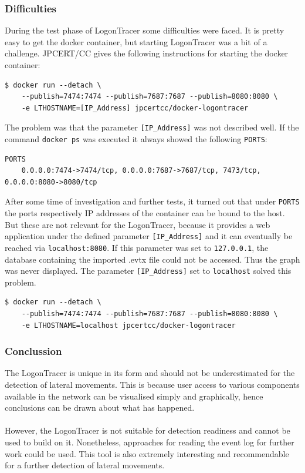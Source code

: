 \subsubsection{Difficulties}
During the test phase of LogonTracer some difficulties were faced. It is pretty easy to get the docker container, but starting LogonTracer was a bit of a challenge. JPCERT/CC gives the following instructions for starting the docker container:
\begin{lstlisting}[language=HTML,caption=LogonTracer: given docker run command]
    $ docker run --detach \
    --publish=7474:7474 --publish=7687:7687 --publish=8080:8080 \
    -e LTHOSTNAME=[IP_Address] jpcertcc/docker-logontracer
\end{lstlisting}
The problem was that the parameter \lstinline|[IP_Address]| was not described well. If the command \lstinline|docker ps| was executed it always showed the following \lstinline|PORTS|:
\begin{lstlisting}[caption=LogonTracer: docker ps (PORTS)]
    PORTS
    0.0.0.0:7474->7474/tcp, 0.0.0.0:7687->7687/tcp, 7473/tcp, 0.0.0.0:8080->8080/tcp
\end{lstlisting}
After some time of investigation and further tests, it turned out that under \lstinline|PORTS| the ports respectively IP addresses of the container can be bound to the host. But these are not relevant for the LogonTracer, because it provides a web application under the defined parameter \lstinline|[IP_Address]| and it can eventually be reached via \lstinline|localhost:8080|. If this parameter was set to \lstinline|127.0.0.1|, the database containing the imported .evtx file could not be accessed. Thus the graph was never displayed. The parameter \lstinline|[IP_Address]| set to \lstinline|localhost| solved this problem.

\begin{lstlisting}[language=HTML,caption=LogonTracer: recommended docker run command]
    $ docker run --detach \
    --publish=7474:7474 --publish=7687:7687 --publish=8080:8080 \
    -e LTHOSTNAME=localhost jpcertcc/docker-logontracer
\end{lstlisting}
\subsubsection{Conclussion}
The LogonTracer is unique in its form and should not be underestimated for the detection of lateral movements. This is because user access to various components available in the network can be visualised simply and graphically, hence conclusions can be drawn about what has happened.
\\\\
However, the LogonTracer is not suitable for detection readiness and cannot be used to build on it. Nonetheless, approaches for reading the event log for further work could be used. This tool is also extremely interesting and recommendable for a further detection of lateral movements.

